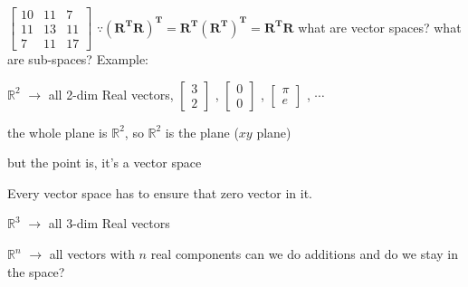 \documentclass[12pt, a4paper]{article}
\begin{document}
{\begin{math}
\begin{bmatrix}
		10 & 11 & 7 \\
		11 & 13 & 11 \\
		7 & 11 & 17
	\end{bmatrix}
\end{math}
\newline
\begin{math}
	\because
	\left({\mathbf{R^TR}}\right)^{\mathbf{T}}
	 = 
	{\mathbf{R^T}}\left({\mathbf{R^T}}\right)^{\mathbf{T}}
	 = 
	{\mathbf{R^T}}{\mathbf{R}}
\end{math}
\newpage
\noindent what are vector spaces?
\newline
what are sub-spaces?
\vspace{14pt}
\newline
Example:
\par $\mathbb{R}^2$ $\rightarrow$ all 2-dim Real vectors, 
\begin{math}
	\begin{bmatrix}
		3 \\
		2
	\end{bmatrix}
\end{math}
, 
\begin{math}
	\begin{bmatrix}
		0 \\
		0
	\end{bmatrix}
\end{math}
, 
\begin{math}
	\begin{bmatrix}
		\pi \\
		e
	\end{bmatrix}
\end{math}
, 
$\cdots$
\par the whole plane is $\mathbb{R}^2$, so $\mathbb{R}^2$ is the plane ($xy$ plane)
\par but the point is, it's a vector space
\par {\textcolor{anhao-scarlet}{Every vector space has to ensure that zero vector in it.}}
\par $\mathbb{R}^3$ $\rightarrow$ all 3-dim Real vectors
\par $\mathbb{R}^n$ $\rightarrow$ all vectors with $n$ real components
\vspace{14pt}
\newline
can we do additions and do we stay in the space?
\begin{center}

\end{center}}
\end{document}
